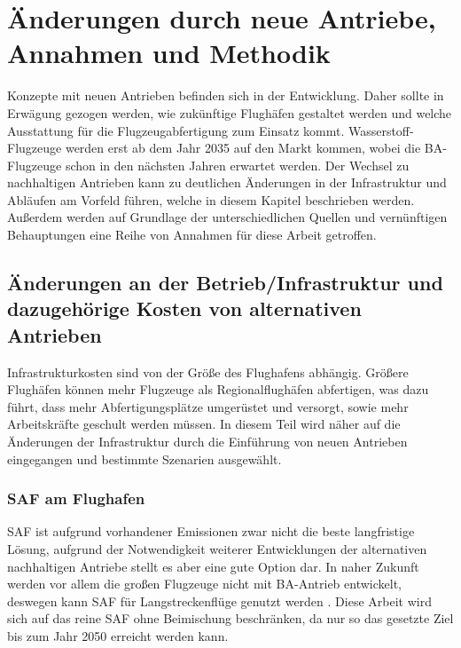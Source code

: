 \chapter{Änderungen durch neue Antriebe, Annahmen und Methodik}
\label{ch:Änderungen durch neue Antriebe, Annahmen und Methodik}

Konzepte mit neuen Antrieben befinden sich in der Entwicklung.
Daher sollte in Erwägung gezogen werden, wie zukünftige Flughäfen 
gestaltet werden und welche Ausstattung für 
die Flugzeugabfertigung zum Einsatz kommt.
Wasserstoff-Flugzeuge werden erst ab dem Jahr 2035 auf den Markt kommen, 
wobei die BA-Flugzeuge schon in den nächsten Jahren erwartet werden.
Der Wechsel zu nachhaltigen Antrieben kann zu deutlichen Änderungen 
in der Infrastruktur und Abläufen am Vorfeld führen, 
welche in diesem Kapitel beschrieben werden.
Außerdem werden auf Grundlage der unterschiedlichen Quellen und 
vernünftigen Behauptungen eine Reihe von Annahmen für diese Arbeit getroffen.
%

\section{Änderungen an der Betrieb/Infrastruktur und dazugehörige Kosten von alternativen Antrieben}
\label{s:Änderungen an der Abfertigung und dazugehörige Kosten von alternativen Antrieben}

Infrastrukturkosten sind von der Größe des Flughafens abhängig. 
Größere Flughäfen können mehr Flugzeuge als Regionalflughäfen abfertigen, 
was dazu führt, dass mehr Abfertigungsplätze umgerüstet und versorgt, 
sowie mehr Arbeitskräfte geschult werden müssen. 
In diesem Teil wird näher auf die Änderungen der Infrastruktur durch 
die Einführung von neuen Antrieben eingegangen und bestimmte Szenarien ausgewählt.

\subsection{SAF am Flughafen}
SAF ist aufgrund vorhandener Emissionen zwar nicht die beste langfristige Lösung, 
aufgrund der Notwendigkeit weiterer Entwicklungen der alternativen nachhaltigen 
Antriebe stellt es aber eine gute Option dar. 
In naher Zukunft werden vor allem die großen Flugzeuge nicht mit BA-Antrieb entwickelt, 
deswegen kann SAF für Langstreckenflüge genutzt werden \cite{dalmia2022powering}.
Diese Arbeit wird sich auf das reine SAF ohne Beimischung beschränken, 
da nur so das gesetzte Ziel bis zum Jahr 2050 erreicht werden kann.


